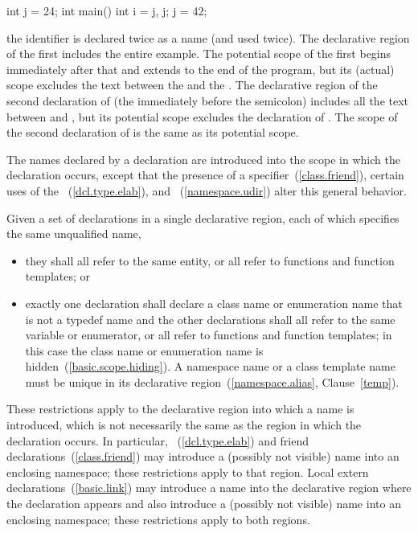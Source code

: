 \begin{codeblock}
int j = 24;
int main() {
  int i = j, j;
  j = 42;
}
\end{codeblock}

the identifier  is declared twice as a name (and used twice).
The declarative region of the first  includes the entire
example. The potential scope of the first  begins immediately
after that  and extends to the end of the program, but its
(actual) scope excludes the text between the \tcode{,} and the
\tcode{\}}. The declarative region of the second declaration of
 (the  immediately before the semicolon) includes all
the text between \tcode{\{} and \tcode{\}}, but its potential scope
excludes the declaration of . The scope of the second
declaration of  is the same as its potential scope.
\exitexample

\pnum
The names declared by a declaration are introduced into the scope in
which the declaration occurs, except that the presence of a
 specifier~(\ref{class.friend}), certain uses of the
~(\ref{dcl.type.elab}), and
~(\ref{namespace.udir}) alter this general
behavior.

\pnum
Given a set of declarations in a single declarative region, each of
which specifies the same unqualified name,

\begin{itemize}
\item they shall all refer to the same entity, or all refer to functions
and function templates; or
\item exactly one declaration shall declare a class name or enumeration
name that is not a typedef name and the other declarations shall all
refer to the same variable or enumerator, or all refer to functions and
function templates; in this case the class name or enumeration name is
hidden~(\ref{basic.scope.hiding}). \enternote A namespace name or a
class template name must be unique in its declarative
region~(\ref{namespace.alias}, Clause~\ref{temp}). \exitnote
\end{itemize}
\enternote These restrictions apply to the declarative region into which
a name is introduced, which is not necessarily the same as the region in
which the declaration occurs. In particular,
~(\ref{dcl.type.elab}) and
friend declarations~(\ref{class.friend}) may introduce a (possibly not
visible) name into an enclosing namespace; these restrictions apply to
that region. Local extern declarations~(\ref{basic.link}) may introduce
a name into the declarative region where the declaration appears and
also introduce a (possibly not visible) name into an enclosing
namespace; these restrictions apply to both regions. \exitnote

